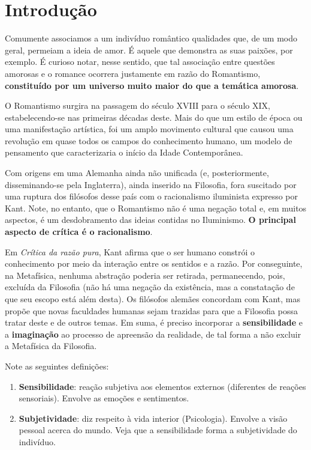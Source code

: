 
\chapter{Introdução}

Comumente associamos a um indivíduo romântico qualidades que, de um modo geral, permeiam a ideia de amor. É aquele que demonstra as suas paixões, por exemplo. É curioso notar, nesse sentido, que tal associação entre questões amorosas e o romance ocorrera justamente em razão do Romantismo, \textbf{constituído por um universo muito maior do que a temática amorosa}.

O Romantismo surgira na passagem do século XVIII para o século XIX, estabelecendo-se nas primeiras décadas deste. Mais do que um estilo de época ou uma manifestação artística, foi um amplo movimento cultural que causou uma revolução em quase todos os campos do conhecimento humano, um modelo de pensamento que caracterizaria o início da Idade Contemporânea.

Com origens em uma Alemanha ainda não unificada (e, posteriormente, disseminando-se pela Inglaterra), ainda inserido na Filosofia, fora suscitado por uma ruptura dos filósofos desse país com o racionalismo iluminista expresso por Kant. Note, no entanto, que o Romantismo não é uma negação total e, em muitos aspectos, é um desdobramento das ideias contidas no Iluminismo. \textbf{O principal aspecto de crítica é o racionalismo}.

Em \textit{Crítica da razão pura}, Kant afirma que o ser humano constrói o conhecimento por meio da interação entre os sentidos e a razão. Por conseguinte, na Metafísica, nenhuma abstração poderia ser retirada, permanecendo, pois, excluída da Filosofia (não há uma negação da existência, mas a constatação de que seu escopo está além desta). Os filósofos alemães concordam com Kant, mas propõe que novas faculdades humanas sejam trazidas para que a Filosofia possa tratar deste e de outros temas. Em suma, é preciso incorporar a \textbf{sensibilidade} e a \textbf{imaginação} ao processo de apreensão da realidade, de tal forma a não excluir a Metafísica da Filosofia. 

Note as seguintes definições:

\begin{enumerate}
\item \textbf{Sensibilidade}: reação subjetiva aos elementos externos (diferentes de reações sensoriais). Envolve as emoções e sentimentos.
\item \textbf{Subjetividade}: diz respeito à vida interior (Psicologia). Envolve a visão pessoal acerca do mundo. Veja que a sensibilidade forma a subjetividade do indivíduo.
\end{enumerate}

